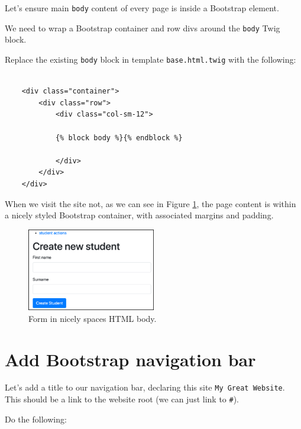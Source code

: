 \documentclass[a4paperpaper,openright]{book}
\begin{document}
Let's ensure main \texttt{body} content of every page is inside a
Bootstrap element.

We need to wrap a Bootstrap container and row divs around the
\texttt{body} Twig block.

Replace the existing \texttt{body} block in template
\texttt{base.html.twig} with the following:

\begin{verbatim}

    <div class="container">
        <div class="row">
            <div class="col-sm-12">

            {% block body %}{% endblock %}

            </div>
        </div>
    </div>
\end{verbatim}

When we visit the site not, as we can see in Figure
\ref{form_nice_body}, the page content is within a nicely styled
Bootstrap container, with associated margins and padding.

\begin{figure}
\centering
\includegraphics[width=0.5\textwidth,height=\textheight]{./tex2pdf.-8a1528da847c818a/b7aec3203c234fdc0b487b9331755c42a04f3b27.png}
\caption{Form in nicely spaces HTML body. \label{form_nice_body}}
\end{figure}

\hypertarget{add-bootstrap-navigation-bar}{%
\section{Add Bootstrap navigation
bar}\label{add-bootstrap-navigation-bar}}

Let's add a title to our navigation bar, declaring this site
\texttt{My\ Great\ Website}. This should be a link to the website root
(we can just link to \texttt{\#}).

Do the following:
\end{document}
